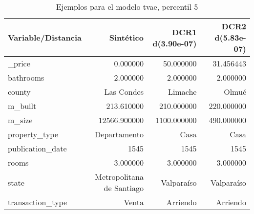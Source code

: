 \begin{table}[H]
\centering
\fontsize{10}{14}\selectfont
\caption{Ejemplos para el modelo tvae, percentil 5}
\label{table-example-economicos-a-2-tvae-5p}
\begin{tabular}{|l|r|r|r|}
\hline
\rowcolor[gray]{0.8}
Variable/Distancia & Sintético & DCR1 d(3.90e-07) & DCR2 d(5.83e-07) \\
\hline \_price & \cellcolor[rgb]{0.9, 0.54, 0.52} 0.000000 & 50.000000 & 31.456443 \\
\hline bathrooms & \cellcolor[rgb]{0.9, 0.54, 0.52} 2.000000 & \cellcolor[rgb]{0.9, 0.54, 0.52} 2.000000 & \cellcolor[rgb]{0.9, 0.54, 0.52} 2.000000 \\
\hline county & \cellcolor[rgb]{0.9, 0.54, 0.52} Las Condes & Limache & Olmué \\
\hline m\_built & \cellcolor[rgb]{0.9, 0.54, 0.52} 213.610000 & 210.000000 & 220.000000 \\
\hline m\_size & \cellcolor[rgb]{0.9, 0.54, 0.52} 12566.900000 & 1100.000000 & 490.000000 \\
\hline property\_type & \cellcolor[rgb]{0.9, 0.54, 0.52} Departamento & Casa & Casa \\
\hline publication\_date & \cellcolor[rgb]{0.9, 0.54, 0.52} 1545 & \cellcolor[rgb]{0.9, 0.54, 0.52} 1545 & \cellcolor[rgb]{0.9, 0.54, 0.52} 1545 \\
\hline rooms & \cellcolor[rgb]{0.9, 0.54, 0.52} 3.000000 & \cellcolor[rgb]{0.9, 0.54, 0.52} 3.000000 & \cellcolor[rgb]{0.9, 0.54, 0.52} 3.000000 \\
\hline state & \cellcolor[rgb]{0.9, 0.54, 0.52} Metropolitana de Santiago & Valparaíso & Valparaíso \\
\hline transaction\_type & \cellcolor[rgb]{0.9, 0.54, 0.52} Venta & Arriendo & Arriendo \\
\hline
\end{tabular}
\end{table}
